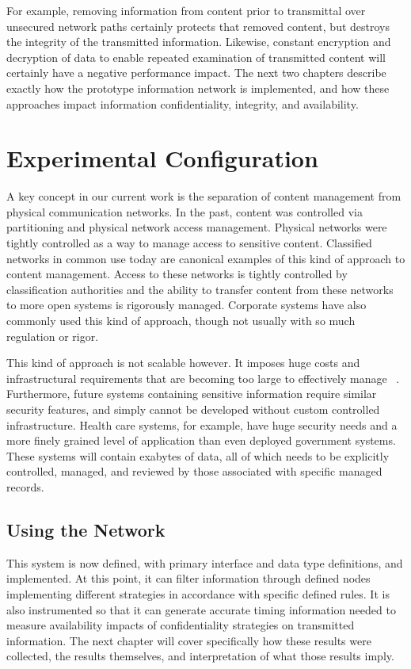 \documentclass[botnum,fleqn,final]{unmeethesis}
\begin{document}
For example, removing information from content prior to transmittal over unsecured network paths certainly protects that removed content, but destroys the integrity of the transmitted information.  Likewise, constant encryption and decryption of data to enable repeated examination of transmitted content will certainly have a negative performance impact.  The next two chapters describe exactly how the prototype information network is implemented, and how these approaches impact information confidentiality, integrity, and availability.

\chapter{Experimental Configuration}
A key concept in our current work is the separation of content management from physical communication networks.  In the past, content was controlled via partitioning and physical network access management.  Physical networks were tightly controlled as a way to manage access to sensitive content.  Classified networks in common use today are canonical examples of this kind of approach to content management.  Access to these networks is tightly controlled by classification authorities and the ability to transfer content from these networks to more open systems is rigorously managed.  Corporate systems have also commonly used this kind of approach, though not usually with so much regulation or rigor.

This kind of approach is not scalable however.  It imposes huge costs and infrastructural requirements that are becoming too large to effectively manage ~\cite{Tallon:2010:UDI:1735223.1735253}.  Furthermore, future systems containing sensitive information require similar security features, and simply cannot be developed without custom controlled infrastructure.  Health care systems, for example, have huge security needs and a more finely grained level of application than even deployed government systems.  These systems will contain exabytes of data, all of which needs to be explicitly controlled, managed, and reviewed by those associated with specific managed records.


\section{Using the Network}
This system is now defined, with primary interface and data type definitions, and implemented.  At this point, it can filter information through defined nodes implementing different strategies in accordance with specific defined rules.  It is also instrumented so that it can generate accurate timing information needed to measure availability impacts of confidentiality strategies on transmitted information.  The next chapter will cover specifically how these results were collected, the results themselves, and interpretation of what those results imply.
\end{document}
